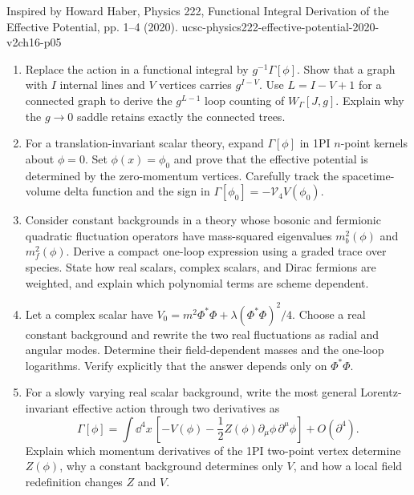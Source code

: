 \begin{enumerate}
  {Inspired by Howard Haber, Physics 222, Functional Integral Derivation of the Effective Potential, pp. 1--4 (2020).}
  {ucsc-physics222-effective-potential-2020-v2ch16-p05}
  \begin{enumerate}
    \item[(a)]
    Replace the action in a functional integral by \(g^{-1}\Gamma[\phi]\).
    Show that a graph with \(I\) internal lines and \(V\) vertices carries
    \(g^{I-V}\).  Use \(L=I-V+1\) for a connected graph to derive the
    \(g^{L-1}\) loop counting of \(W_\Gamma[J,g]\).  Explain why the
    \(g\to0\) saddle retains exactly the connected trees.
    \item[(b)]
    For a translation-invariant scalar theory, expand \(\Gamma[\phi]\) in
    1PI \(n\)-point kernels about \(\phi=0\).  Set \(\phi(x)=\phi_0\) and
    prove that the effective potential is determined by the zero-momentum
    vertices.  Carefully track the spacetime-volume delta function and the
    sign in \(\Gamma[\phi_0]=-\mathcal V_4V(\phi_0)\).
    \item[(c)]
    Consider constant backgrounds in a theory whose bosonic and fermionic
    quadratic fluctuation operators have mass-squared eigenvalues
    \(m_b^2(\phi)\) and \(m_f^2(\phi)\).  Derive a compact one-loop expression
    using a graded trace over species.  State how real scalars, complex
    scalars, and Dirac fermions are weighted, and explain which polynomial
    terms are scheme dependent.
    \item[(d)]
    Let a complex scalar have
    \(V_0=m^2\Phi^*\Phi+\lambda(\Phi^*\Phi)^2/4\).  Choose a real constant
    background and rewrite the two real fluctuations as radial and angular
    modes.  Determine their field-dependent masses and the one-loop
    logarithms.  Verify explicitly that the answer depends only on
    \(\Phi^*\Phi\).
    \item[(e)]
    For a slowly varying real scalar background, write the most general
    Lorentz-invariant effective action through two derivatives as
    \[
      \Gamma[\phi]=\int \dd^4x\,
        \left[-V(\phi)-\frac12 Z(\phi)
        \partial_\mu\phi\,\partial^\mu\phi\right]+O(\partial^4).
    \]
    Explain which momentum derivatives of the 1PI two-point vertex determine
    \(Z(\phi)\), why a constant background determines only \(V\), and how a
    local field redefinition changes \(Z\) and \(V\).
  \end{enumerate}


\end{enumerate}
